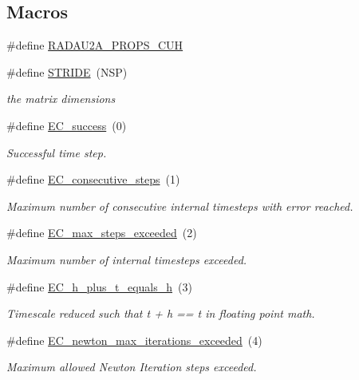\subsection*{Macros}
\begin{DoxyCompactItemize}
\item 
\#define \hyperlink{radau2a__props_8cuh_acb5834e026c7d7045b16acfcb25a5f7d}{R\+A\+D\+A\+U2\+A\+\_\+\+P\+R\+O\+P\+S\+\_\+\+C\+UH}
\item 
\#define \hyperlink{radau2a__props_8cuh_a351d54267048643c4365f6a24641d0cf}{S\+T\+R\+I\+DE}~(N\+SP)
\begin{DoxyCompactList}\small\item\em the matrix dimensions \end{DoxyCompactList}\item 
\#define \hyperlink{group__RKCU__ErrCodes_gabd83bc0f9f475a2189a4db4a08b790ca}{E\+C\+\_\+success}~(0)
\begin{DoxyCompactList}\small\item\em Successful time step. \end{DoxyCompactList}\item 
\#define \hyperlink{group__RKCU__ErrCodes_gae0287841c08f86f5709660fd731615ad}{E\+C\+\_\+consecutive\+\_\+steps}~(1)
\begin{DoxyCompactList}\small\item\em Maximum number of consecutive internal timesteps with error reached. \end{DoxyCompactList}\item 
\#define \hyperlink{group__RKCU__ErrCodes_ga0f0275d9851ab5c19b79a963d5084df3}{E\+C\+\_\+max\+\_\+steps\+\_\+exceeded}~(2)
\begin{DoxyCompactList}\small\item\em Maximum number of internal timesteps exceeded. \end{DoxyCompactList}\item 
\#define \hyperlink{group__RKCU__ErrCodes_ga9326efd544880e2683c4453365ca2704}{E\+C\+\_\+h\+\_\+plus\+\_\+t\+\_\+equals\+\_\+h}~(3)
\begin{DoxyCompactList}\small\item\em Timescale reduced such that t + h == t in floating point math. \end{DoxyCompactList}\item 
\#define \hyperlink{group__RKCU__ErrCodes_gaae2906abd9ae8a2791c2e8626ca73a32}{E\+C\+\_\+newton\+\_\+max\+\_\+iterations\+\_\+exceeded}~(4)
\begin{DoxyCompactList}\small\item\em Maximum allowed Newton Iteration steps exceeded. \end{DoxyCompactList}\end{DoxyCompactItemize}


